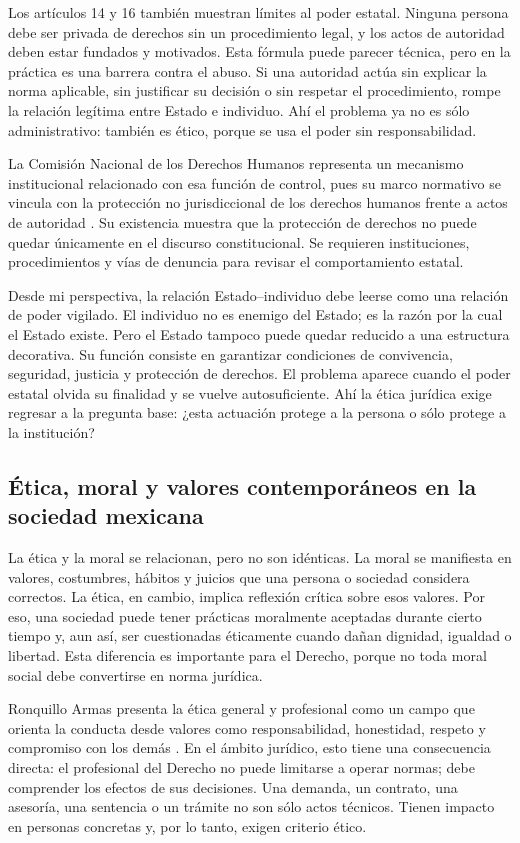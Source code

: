 \documentclass[
	spanish,
	letterpaper, oneside
]{article}
\begin{document}
Los artículos 14 y 16 también muestran límites al poder estatal. Ninguna persona debe ser privada de derechos sin un procedimiento legal, y los actos de autoridad deben estar fundados y motivados. Esta fórmula puede parecer técnica, pero en la práctica es una barrera contra el abuso. Si una autoridad actúa sin explicar la norma aplicable, sin justificar su decisión o sin respetar el procedimiento, rompe la relación legítima entre Estado e individuo. Ahí el problema ya no es sólo administrativo: también es ético, porque se usa el poder sin responsabilidad.

La Comisión Nacional de los Derechos Humanos representa un mecanismo institucional relacionado con esa función de control, pues su marco normativo se vincula con la protección no jurisdiccional de los derechos humanos frente a actos de autoridad \citep{cndhMarcoNormativo}. Su existencia muestra que la protección de derechos no puede quedar únicamente en el discurso constitucional. Se requieren instituciones, procedimientos y vías de denuncia para revisar el comportamiento estatal.

Desde mi perspectiva, la relación Estado--individuo debe leerse como una relación de poder vigilado. El individuo no es enemigo del Estado; es la razón por la cual el Estado existe. Pero el Estado tampoco puede quedar reducido a una estructura decorativa. Su función consiste en garantizar condiciones de convivencia, seguridad, justicia y protección de derechos. El problema aparece cuando el poder estatal olvida su finalidad y se vuelve autosuficiente. Ahí la ética jurídica exige regresar a la pregunta base: ¿esta actuación protege a la persona o sólo protege a la institución?

\subsection{Ética, moral y valores contemporáneos en la sociedad mexicana}

La ética y la moral se relacionan, pero no son idénticas. La moral se manifiesta en valores, costumbres, hábitos y juicios que una persona o sociedad considera correctos. La ética, en cambio, implica reflexión crítica sobre esos valores. Por eso, una sociedad puede tener prácticas moralmente aceptadas durante cierto tiempo y, aun así, ser cuestionadas éticamente cuando dañan dignidad, igualdad o libertad. Esta diferencia es importante para el Derecho, porque no toda moral social debe convertirse en norma jurídica.

Ronquillo Armas presenta la ética general y profesional como un campo que orienta la conducta desde valores como responsabilidad, honestidad, respeto y compromiso con los demás \citep{ronquilloarmasEticaGeneralProfesional2018}. En el ámbito jurídico, esto tiene una consecuencia directa: el profesional del Derecho no puede limitarse a operar normas; debe comprender los efectos de sus decisiones. Una demanda, un contrato, una asesoría, una sentencia o un trámite no son sólo actos técnicos. Tienen impacto en personas concretas y, por lo tanto, exigen criterio ético.
\end{document}
